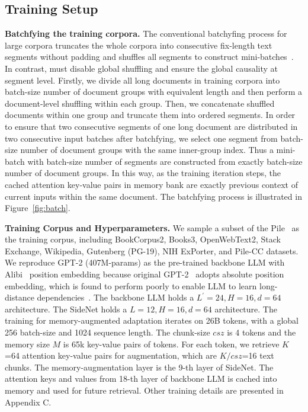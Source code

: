 \subsection{Training Setup}
\label{sec:setup}
\textbf{Batchfying the training corpora. } The conventional batchyfing process for large corpora truncates the whole corpora into consecutive fix-length text segments without padding and shuffles all segments to construct mini-batches~\citep{gpt2}. In contrast, \our{} must disable global shuffling and ensure the global causality at segment level. Firstly, we divide all long documents in training corpora into batch-size number of document groups with equivalent length and then perform a document-level shuffling within each group. Then, we concatenate shuffled documents within one group and truncate them into ordered segments. In order to ensure that two consecutive segments of one long document are distributed in two consecutive input batches after batchfying, we select one segment from batch-size number of document groups with the same inner-group index. Thus a mini-batch with batch-size number of segments are constructed from exactly batch-size number of document groups. In this way, as the training iteration steps, the cached attention key-value pairs in memory bank are exactly previous context of current inputs within the same document. The batchfying process is illustrated in Figure~\ref{fig:batch}.

\textbf{Training Corpus and Hyperparameters.} We sample a subset of the Pile~\citep{pile} as the training corpus, including BookCorpus2, Books3, OpenWebText2, Stack Exchange, Wikipedia, Gutenberg (PG-19), NIH ExPorter, and Pile-CC datasets. We reproduce GPT-2 (407M-params) as the pre-trained backbone LLM with Alibi~\citep{alibi} position embedding because original GPT-2~\citep{gpt2} adopts absolute position embedding, which is found to perform poorly to enable LLM to learn long-distance dependencies~\citep{transformerxl}. The backbone LLM holds a $L^\prime=24, H=16,d=64$ architecture. The SideNet holds a $L=12, H=16,d=64$ architecture. The training for memory-augmented adaptation iterates on 26B tokens, with a global 256 batch-size and 1024 sequence length. The chunk-size $csz$ is 4 tokens and the memory size $M$ is 65k key-value pairs of tokens. For each token, we retrieve $K$=64 attention key-value pairs for augmentation, which are $K/csz$=16 text chunks. The memory-augmentation layer is the 9-th layer of SideNet. The attention keys and values from 18-th layer of backbone LLM is cached into memory and used for future retrieval. Other training details are presented in Appendix C.

